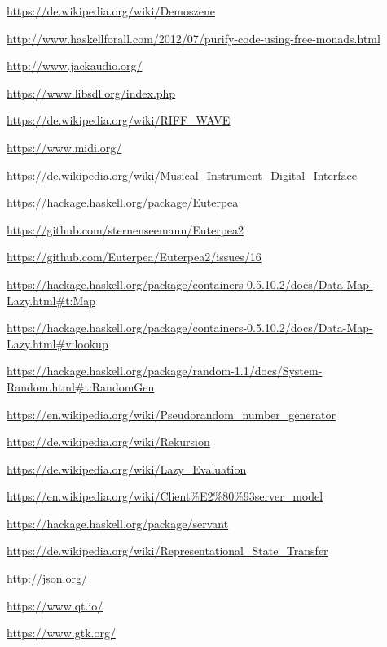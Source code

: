 \documentclass[a4paper,twocolumn]{article}
\begin{document}
\begin{thebibliography}{9}
  \url{https://de.wikipedia.org/wiki/Demoszene}

  \url{http://www.haskellforall.com/2012/07/purify-code-using-free-monads.html}

  \url{http://www.jackaudio.org/}

  \url{https://www.libsdl.org/index.php}

  \url{https://de.wikipedia.org/wiki/RIFF_WAVE}

  \url{https://www.midi.org/}

  \url{https://de.wikipedia.org/wiki/Musical_Instrument_Digital_Interface}

  \url{https://hackage.haskell.org/package/Euterpea}

  \url{https://github.com/sternenseemann/Euterpea2}

  \url{https://github.com/Euterpea/Euterpea2/issues/16}

  \url{https://hackage.haskell.org/package/containers-0.5.10.2/docs/Data-Map-Lazy.html#t:Map}

  \url{https://hackage.haskell.org/package/containers-0.5.10.2/docs/Data-Map-Lazy.html#v:lookup}

  \url{https://hackage.haskell.org/package/random-1.1/docs/System-Random.html#t:RandomGen}

  \url{https://en.wikipedia.org/wiki/Pseudorandom_number_generator}

  \url{https://de.wikipedia.org/wiki/Rekursion}

  \url{https://de.wikipedia.org/wiki/Lazy_Evaluation}

  \url{https://en.wikipedia.org/wiki/Client%E2%80%93server_model}

  \url{https://hackage.haskell.org/package/servant}

  \url{https://de.wikipedia.org/wiki/Representational_State_Transfer}

  \url{http://json.org/}

  \url{https://www.qt.io/}

  \url{https://www.gtk.org/}
\end{thebibliography}
\end{document}
